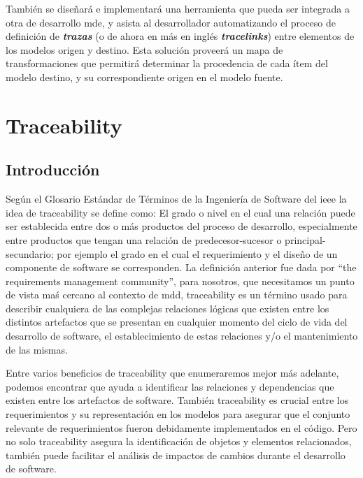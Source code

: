 \documentclass[a4paper,12pt,oneside,spanish]{book}
\begin{document}
También se diseñará e implementará una herramienta que pueda ser integrada a otra de desarrollo \gls{mde}, y asista al desarrollador automatizando el proceso de definición de \textit{\textbf{trazas}} (o de ahora en más en inglés \textit{\textbf{tracelinks}}) entre elementos de los modelos origen y destino. Esta solución proveerá un mapa de transformaciones que permitirá determinar la procedencia de cada ítem del modelo destino, y su correspondiente origen en el modelo fuente.


\mainmatter
\chapter{Traceability}

\section{Introducción}

Según el Glosario Estándar de Términos de la Ingeniería de Software del \gls{ieee} \cite{IEEE} la idea de traceability se define como: El grado o nivel en el cual una relación puede ser establecida entre dos o más productos del proceso de desarrollo, especialmente entre productos que tengan una relación de predecesor-sucesor o principal-secundario; por ejemplo el grado en el cual el requerimiento y el diseño de un componente de software se corresponden. La definición anterior fue dada por “the requirements management community”, para nosotros, que necesitamos un punto de vista maś cercano al contexto de \gls{mdd}, traceability es un término usado para describir cualquiera de las complejas relaciones lógicas que existen entre los distintos artefactos que se presentan en cualquier momento del ciclo de vida del desarrollo de software, el establecimiento de estas relaciones y/o el mantenimiento de las mismas.

Entre varios beneficios de traceability que enumeraremos mejor más adelante, podemos encontrar que ayuda a identificar las relaciones y dependencias que existen entre los artefactos de software. También traceability es crucial entre los requerimientos y su representación en los modelos para asegurar que el conjunto relevante de requerimientos fueron debidamente implementados en el código. Pero no solo traceability asegura la identificación de objetos y elementos relacionados, también puede facilitar el análisis de impactos de cambios durante el desarrollo de software.
\end{document}
